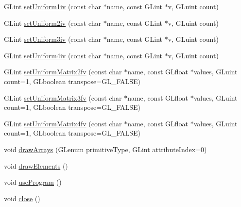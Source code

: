 \begin{DoxyCompactItemize}
\item 
G\+Lint \mbox{\hyperlink{classshaderutils_1_1_shader_proxy_a6a9b8a7ff2d0415e427ef002a1005a2d}{set\+Uniform1iv}} (const char $\ast$name, const G\+Lint $\ast$v, G\+Luint count)
\item 
G\+Lint \mbox{\hyperlink{classshaderutils_1_1_shader_proxy_aa06e5c62fda6ecb768f11c7cbef9775d}{set\+Uniform2iv}} (const char $\ast$name, const G\+Lint $\ast$v, G\+Luint count)
\item 
G\+Lint \mbox{\hyperlink{classshaderutils_1_1_shader_proxy_a98c77d6389dbbd701c73b9c63fbd53d2}{set\+Uniform3iv}} (const char $\ast$name, const G\+Lint $\ast$v, G\+Luint count)
\item 
G\+Lint \mbox{\hyperlink{classshaderutils_1_1_shader_proxy_a920b2752650d3a211536576bb5a68698}{set\+Uniform4iv}} (const char $\ast$name, const G\+Lint $\ast$v, G\+Luint count)
\item 
G\+Lint \mbox{\hyperlink{classshaderutils_1_1_shader_proxy_a673855a58b328431d4346a353342c990}{set\+Uniform\+Matrix2fv}} (const char $\ast$name, const G\+Lfloat $\ast$values, G\+Luint count=1, G\+Lboolean transpose=G\+L\+\_\+\+F\+A\+L\+SE)
\item 
G\+Lint \mbox{\hyperlink{classshaderutils_1_1_shader_proxy_a4f54eb9942ebbfd3f681c9c5a1c6bb77}{set\+Uniform\+Matrix3fv}} (const char $\ast$name, const G\+Lfloat $\ast$values, G\+Luint count=1, G\+Lboolean transpose=G\+L\+\_\+\+F\+A\+L\+SE)
\item 
G\+Lint \mbox{\hyperlink{classshaderutils_1_1_shader_proxy_a1e06ec7d1d9818ebedbd938e055c2dc6}{set\+Uniform\+Matrix4fv}} (const char $\ast$name, const G\+Lfloat $\ast$values, G\+Luint count=1, G\+Lboolean transpose=G\+L\+\_\+\+F\+A\+L\+SE)
\item 
void \mbox{\hyperlink{classshaderutils_1_1_shader_proxy_a02078fb32a3e408fd31c51388beb2e1c}{draw\+Arrays}} (G\+Lenum primitive\+Type, G\+Lint attribute\+Index=0)
\item 
void \mbox{\hyperlink{classshaderutils_1_1_shader_proxy_a3b2b201f82d2cbfb814b2d582a73c9e5}{draw\+Elements}} ()
\item 
void \mbox{\hyperlink{classshaderutils_1_1_shader_proxy_ac2b05aa33061973230adcb49191662d7}{use\+Program}} ()
\item 
void \mbox{\hyperlink{classshaderutils_1_1_shader_proxy_a15aab01bb6dec8fdc692cd5a4ade4ed1}{close}} ()
\end{DoxyCompactItemize}


